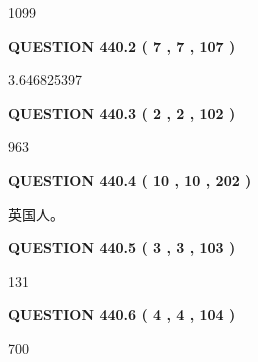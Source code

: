 \documentclass{ctexart}
\begin{document}
  
 
 
\noindent{}

1099
 
 
  
\vspace{0.2in}
  
{\textbf{\Large{QUESTION
440.2 
 ( 7 , 7 , 107 )
}}}
  
  
 
 
\noindent{}

3.646825397
 
 
  
\vspace{0.2in}
  
{\textbf{\Large{QUESTION
440.3 
 ( 2 , 2 , 102 )
}}}
  
  
 
 
\noindent{}

963
 
 
  
\vspace{0.2in}
  
{\textbf{\Large{QUESTION
440.4 
 ( 10 , 10 , 202 )
}}}
  
  
 
 
\noindent{}
 
 
英国人。
 
 
 
 
  
\vspace{0.2in}
  
{\textbf{\Large{QUESTION
440.5 
 ( 3 , 3 , 103 )
}}}
  
  
 
 
\noindent{}

131
 
 
  
\vspace{0.2in}
  
{\textbf{\Large{QUESTION
440.6 
 ( 4 , 4 , 104 )
}}}
  
  
 
 
\noindent{}

700
 
\end{document}
